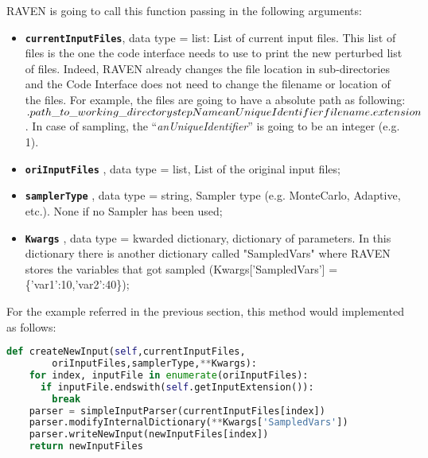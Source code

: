 RAVEN is going to call this function passing in the following arguments:
\begin{itemize}
  \item \textbf{\texttt{currentInputFiles}}, data type = list: List of current
              input files. This list of files is the one the code interface needs to use to print the new perturbed list of files.
              Indeed, RAVEN already changes the file location in sub-directories and the Code Interface does not need to
              change the filename or location of the files. For example, the files are going to have a absolute path as following:
              $.\\ path\_to\_working\_directory\\stepName\\anUniqueIdentifier\\filename.extension$. In case of sampling, the 
              ``\textit{anUniqueIdentifier}'' is going to be an integer (e.g. 1).
  \item \textbf{\texttt{oriInputFiles}} , data type = list, List of the original input files;
  \item  \textbf{\texttt{samplerType}} , data type = string, Sampler type (e.g. MonteCarlo,
               Adaptive, etc.). \nb None if no Sampler has been used;
  \item  \textbf{\texttt{Kwargs}} , data type = kwarded dictionary, dictionary of parameters.
               In this dictionary there is another dictionary
               called "SampledVars" where RAVEN stores the
               variables that got sampled
               (Kwargs['SampledVars'] = \{'var1':10,'var2':40\});
\end{itemize}
For the example referred in the previous section, this method would implemented as follows:
\newline
\begin{lstlisting}[language=python]
  def createNewInput(self,currentInputFiles,
        oriInputFiles,samplerType,**Kwargs):
    for index, inputFile in enumerate(oriInputFiles):
      if inputFile.endswith(self.getInputExtension()):
        break
    parser = simpleInputParser(currentInputFiles[index])
    parser.modifyInternalDictionary(**Kwargs['SampledVars'])
    parser.writeNewInput(newInputFiles[index])
    return newInputFiles
\end{lstlisting}


